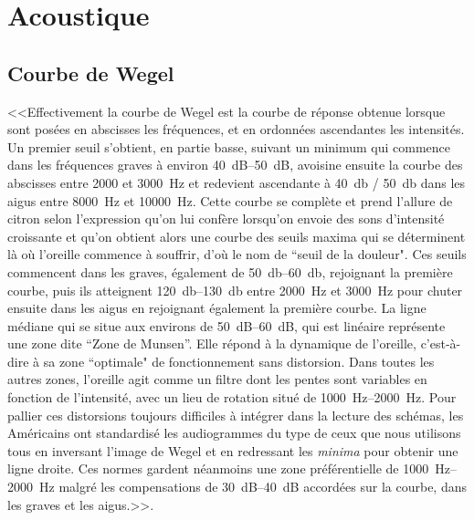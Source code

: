 
\chapter{Acoustique}

\section{Courbe de Wegel}
\label{acoustique}

<<Effectivement la courbe de Wegel est la courbe de réponse obtenue
lorsque sont posées en abscisses les fréquences, et en ordonnées ascendantes
les intensités. Un premier seuil s'obtient, en partie basse, suivant
un minimum qui commence dans les fréquences graves à environ 
\SIrange{40}{50}{\dB}, avoisine ensuite la courbe des abscisses entre 2000 et \SI{3000}{\Hz}
et redevient ascendante à \SI{40}{\decibel} / \SI{50}{\decibel} dans les aigus entre \SI{8000}{\Hz} et
\SI{10000}{\Hz}. Cette courbe se complète et prend l'allure de citron selon
l'expression qu'on lui confère lorsqu'on envoie des
sons d'intensité croissante et qu'on obtient alors une courbe des
seuils maxima qui se déterminent là où l'oreille commence à souffrir,
d'où le nom de ``seuil de la douleur". Ces seuils
commencent dans les graves, également de \SIrange{50}{60}{\decibel}, rejoignant la première
courbe, puis ils atteignent \SIrange{120}{130}{\decibel} entre \SI{2000}{\Hz} et \SI{3000}{\Hz} pour
chuter ensuite dans les aigus en rejoignant également la première
courbe. La ligne médiane qui se situe aux environs de \SIrange{50}{60}{\dB}, qui
est linéaire représente une zone dite ``Zone de Munsen''.
Elle répond à la dynamique de l'oreille, c'est-à-dire
à sa zone ``optimale" de fonctionnement sans
distorsion. Dans toutes les autres zones, l'oreille
agit comme un filtre dont les pentes sont variables en fonction de
l'intensité, avec un lieu de rotation situé de \SIrange{1000}{2000}{\Hz}. Pour pallier ces distorsions toujours difficiles à intégrer
dans la lecture des schémas, les Américains ont standardisé les audiogrammes
du type de ceux que nous utilisons tous en inversant l'image
de Wegel et en redressant les \emph{minima} pour obtenir une ligne droite.
Ces normes gardent néanmoins une zone préférentielle de \SIrange{1000}{2000}{\Hz} malgré les compensations de \SIrange{30}{40}{\dB} accordées sur la courbe,
dans les graves et les aigus.>>\autocite[Bernard Auriol, conversation, conférence]{auriol:conversation_conference}.


